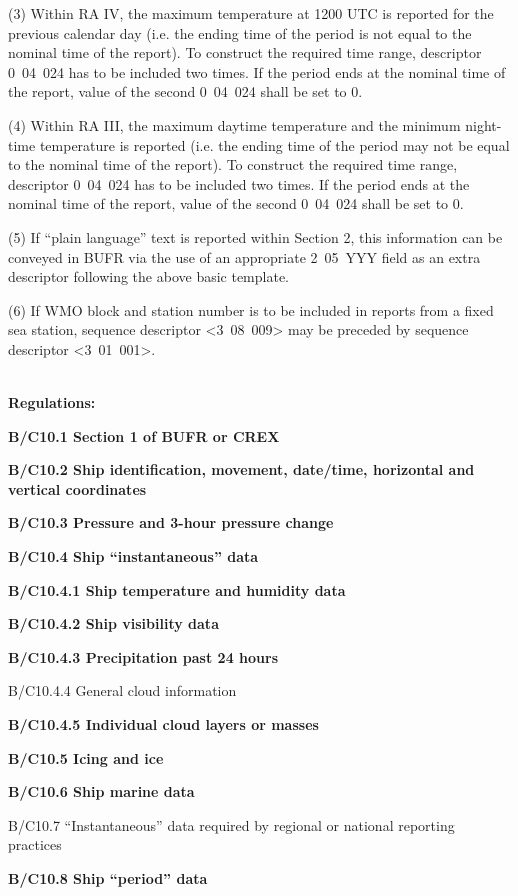 (3) Within RA IV, the maximum temperature at 1200 UTC is reported for the previous calendar day (i.e. the ending time of the period is not equal to the nominal time of the report). To construct the required time range, descriptor 0~04~024 has to be included two times. If the period ends at the nominal time of the report, value of the second 0~04~024 shall be set to 0.

(4) Within RA III, the maximum daytime temperature and the minimum night-time temperature is reported (i.e. the ending time of the period may not be equal to the nominal time of the report). To construct the required time range, descriptor 0~04~024 has to be included two times. If the period ends at the nominal time of the report, value of the second 0~04~024 shall be set to 0.

(5) If ``plain language'' text is reported within Section 2, this information can be conveyed in BUFR via the use of an appropriate 2~05~YYY field as an extra descriptor following the above basic template.

(6) If WMO block and station number is to be included in reports from a fixed sea station, sequence descriptor \textless3~08~009\textgreater{} may be preceded by sequence descriptor \textless3~01~001\textgreater.

\textbf{\\
Regulations:}

\textbf{B/C10.1 Section 1 of BUFR or CREX}

\textbf{B/C10.2 Ship identification, movement, date/time, horizontal and vertical coordinates}

\textbf{B/C10.3 Pressure and 3-hour pressure change}

\textbf{B/C10.4 Ship ``instantaneous'' data}

\textbf{B/C10.4.1 Ship temperature and humidity data}

\textbf{B/C10.4.2 Ship visibility data}

\textbf{B/C10.4.3 Precipitation past 24 hours}

B/C10.4.4 General cloud information

\textbf{B/C10.4.5 Individual cloud layers or masses}

\textbf{B/C10.5 Icing and ice}

\textbf{B/C10.6 Ship marine data}

B/C10.7 ``Instantaneous'' data required by regional or national reporting practices

\textbf{B/C10.8 Ship ``period'' data}

